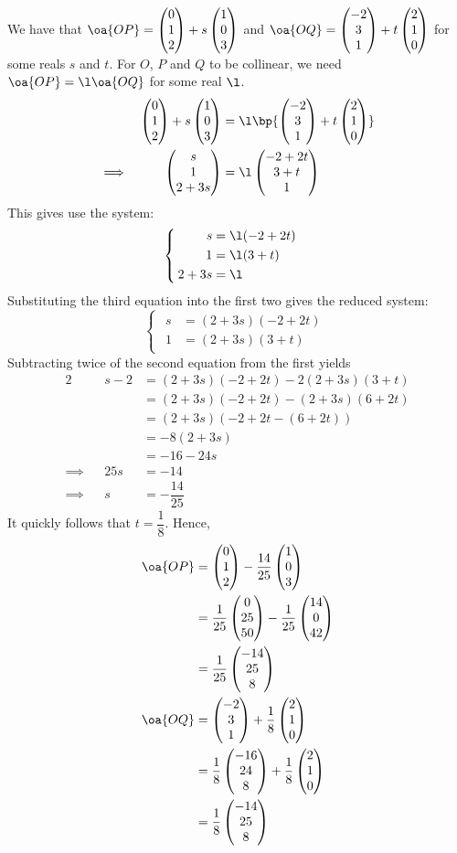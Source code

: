 \documentclass{echw}
\begin{document}
    \solution
        We have that $\oa{OP} = \cveciii012 + s\cveciii103$ and $\oa{OQ} = \cveciii{-2}31 + t\cveciii210$ for some reals $s$ and $t$. For $O$, $P$ and $Q$ to be collinear, we need $\oa{OP} = \l \oa{OQ}$ for some real $\l$.
        \begin{alignat*}{2}
            &&\cveciii012 + s\cveciii103 &= \l\bp{\cveciii{-2}31 + t\cveciii210}\\
            \implies&&\cveciii{s}1{2 + 3s} &= \l\cveciii{-2+2t}{3+t}1
        \end{alignat*}
        This gives use the system:
        \[
            \begin{cases}
                \begin{aligned}
                    s &= \l (-2 + 2t)\\
                    1 &= \l(3 + t)\\
                    2 + 3s &= \l 
                \end{aligned}
            \end{cases}
        \]
        Substituting the third equation into the first two gives the reduced system:
        \[
            \begin{cases}
                \begin{aligned}
                    s &= (2+3s)(-2+2t)\\
                    1 &= (2+3s)(3+t)
                \end{aligned}
            \end{cases}
        \]
        Subtracting twice of the second equation from the first yields
        \begin{alignat*}{2}
            &&s - 2 &= (2+3s)(-2+2t) - 2(2+3s)(3+t)\\
            && &= (2+3s)(-2+2t) - (2+3s)(6+2t)\\
            && &= (2+3s)(-2+2t - (6+2t))\\
            && &= -8(2+3s)\\
            && &= -16 - 24s\\
            \implies&&25s &= -14\\
            \implies&&s &= -\dfrac{14}{25}
        \end{alignat*}
        It quickly follows that $t = \dfrac18$. Hence,
        \begin{align*}
            \oa{OP} &= \cveciii012 - \dfrac{14}{25}\cveciii103\\
            &= \dfrac1{25}\cveciii0{25}{50} - \dfrac1{25}\cveciii{14}0{42}\\
            &= \dfrac1{25}\cveciii{-14}{25}{8}\\
            \oa{OQ} &= \cveciii{-2}31 + \dfrac18\cveciii210\\
            &= \dfrac18 \cveciii{-16}{24}{8} + \dfrac18 \cveciii210\\
            &= \dfrac18 \cveciii{-14}{25}8
        \end{align*}
\end{document}
